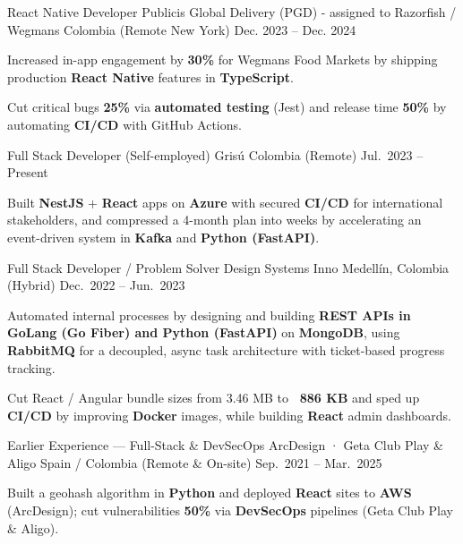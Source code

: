 \begin{cventries}
  \cventry
  {React Native Developer}
  {Publicis Global Delivery (PGD) - assigned to Razorfish / Wegmans}
  {Colombia (Remote \textemdash{} New York)}
  {Dec. 2023 -- Dec. 2024}
  {
    \begin{cvitems}
      \item {Increased in-app engagement by \textbf{30\%} for Wegmans Food Markets by shipping production \textbf{React Native} features in \textbf{TypeScript}.}
      \item {Cut critical bugs \textbf{25\%} via \textbf{automated testing} (Jest) and release time \textbf{50\%} by automating \textbf{CI/CD} with GitHub Actions.}
    \end{cvitems}
  }

  \cventry
  {Full Stack Developer (Self-employed)}
  {Grisú}
  {Colombia (Remote)}
  {Jul.\ 2023 -- Present}
  {
    \begin{cvitems}
      \item {Built \textbf{NestJS} + \textbf{React} apps on \textbf{Azure} with secured \textbf{CI/CD} for international stakeholders, and compressed a 4-month plan into weeks by accelerating an event-driven system in \textbf{Kafka} and \textbf{Python (FastAPI)}.}
    \end{cvitems}
  }

  \cventry
  {Full Stack Developer / Problem Solver}
  {Design Systems Inno}
  {Medellín, Colombia (Hybrid)}
  {Dec.\ 2022 -- Jun.\ 2023}
  {
    \begin{cvitems}
      \item {Automated internal processes by designing and building \textbf{REST APIs in GoLang (Go Fiber) and Python (FastAPI)} on \textbf{MongoDB}, using \textbf{RabbitMQ} for a decoupled, async task architecture with ticket-based progress tracking.}
      \item {Cut React / Angular bundle sizes from 3.46 MB to \textbf{~886 KB} and sped up \textbf{CI/CD} by improving \textbf{Docker} images, while building \textbf{React} admin dashboards.}
    \end{cvitems}
  }

  \cventry
  {Earlier Experience --- Full-Stack \& DevSecOps}
  {ArcDesign · Geta Club Play \& Aligo}
  {Spain / Colombia (Remote \& On-site)}
  {Sep.\ 2021 -- Mar.\ 2025}
  {
    \begin{cvitems}
      \item {Built a geohash algorithm in \textbf{Python} and deployed \textbf{React} sites to \textbf{AWS} (ArcDesign); cut vulnerabilities \textbf{50\%} via \textbf{DevSecOps} pipelines (Geta Club Play \& Aligo).}
    \end{cvitems}
  }

\end{cventries}
